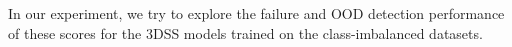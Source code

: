 \documentclass[journal]{IEEEtran}
\begin{document}
In our experiment, we try to explore the failure and OOD detection performance of these scores for the 3DSS models trained on the class-imbalanced datasets.

\end{document}
